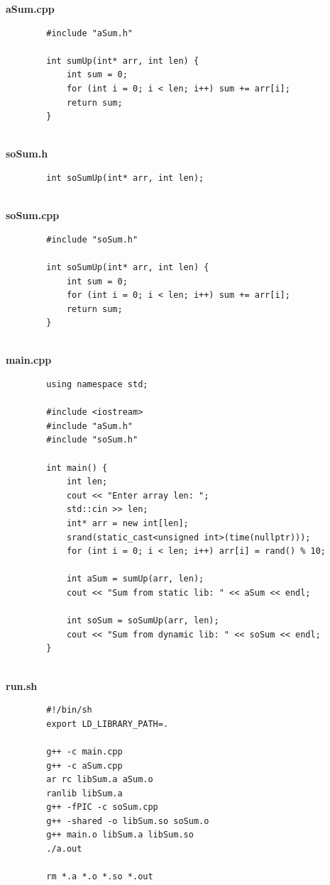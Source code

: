 \documentclass{article}
\begin{document}
\begin{normalsize}
\begin{lstlisting}
	\end{lstlisting}
	
	\noindent\textbf{aSum.cpp}
	\begin{lstlisting}
		#include "aSum.h"
		
		int sumUp(int* arr, int len) {
			int sum = 0;
			for (int i = 0; i < len; i++) sum += arr[i];
			return sum;
		}
		
	\end{lstlisting}
	
	\noindent\textbf{soSum.h}
	\begin{lstlisting}
		int soSumUp(int* arr, int len);
		
	\end{lstlisting}
	
	\noindent\textbf{soSum.cpp}
	\begin{lstlisting}
		#include "soSum.h"
		
		int soSumUp(int* arr, int len) {
			int sum = 0;
			for (int i = 0; i < len; i++) sum += arr[i];
			return sum;
		}
		
	\end{lstlisting}
	
	\noindent\textbf{main.cpp}
	\begin{lstlisting}
		using namespace std;
		
		#include <iostream>
		#include "aSum.h"
		#include "soSum.h"
		
		int main() {
			int len;
			cout << "Enter array len: ";
			std::cin >> len;
			int* arr = new int[len];
			srand(static_cast<unsigned int>(time(nullptr)));
			for (int i = 0; i < len; i++) arr[i] = rand() % 10;
			
			int aSum = sumUp(arr, len);
			cout << "Sum from static lib: " << aSum << endl;
			
			int soSum = soSumUp(arr, len);
			cout << "Sum from dynamic lib: " << soSum << endl;
		}
		
	\end{lstlisting}
	
	\noindent\textbf{run.sh}
	\begin{lstlisting}
		#!/bin/sh
		export LD_LIBRARY_PATH=.
		
		g++ -c main.cpp
		g++ -c aSum.cpp
		ar rc libSum.a aSum.o
		ranlib libSum.a
		g++ -fPIC -c soSum.cpp
		g++ -shared -o libSum.so soSum.o
		g++ main.o libSum.a libSum.so
		./a.out
		
		rm *.a *.o *.so *.out
		
	\end{lstlisting}
	

\end{normalsize}
\end{document}
